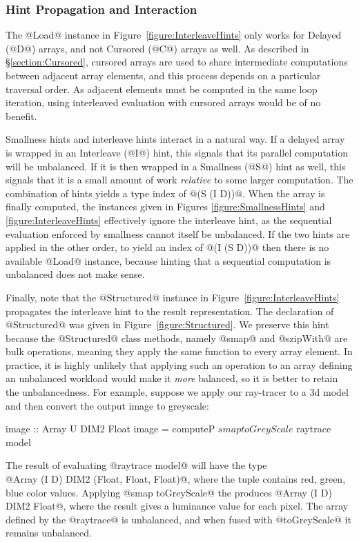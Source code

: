 \subsubsection{Hint Propagation and Interaction}
\label{section:HintInteraction}
The @Load@ instance in Figure~\ref{figure:InterleaveHints} only works for Delayed (@D@) arrays, and not Cursored (@C@) arrays as well. As described in \S\ref{section:Cursored}, cursored arrays are used to share intermediate computations between adjacent array elements, and this process depends on a particular traversal order. As adjacent elements must be computed in the same loop iteration, using interleaved evaluation with cursored arrays would be of no benefit.

Smallness hints and interleave hints interact in a natural way. If a delayed array is wrapped in an Interleave (@I@) hint, this signals that its parallel computation will be unbalanced. If it is then wrapped in a Smallness (@S@) hint as well, this signals that it is a small amount of work \emph{relative} to some larger computation. The combination of hints yields a type index of @(S (I D))@. When the array is finally computed, the instances given in Figures \ref{figure:SmallnessHints} and \ref{figure:InterleaveHints} effectively ignore the interleave hint, as the sequential evaluation enforced by smallness cannot itself be unbalanced. If the two hints are applied in the other order, to yield an index of @(I (S D))@ then there is no available @Load@ instance, because hinting that a sequential computation is unbalanced does not make sense.

Finally, note that the @Structured@ instance in Figure~\ref{figure:InterleaveHints} propagates the interleave hint to the result representation. The declaration of @Structured@ was given in Figure~\ref{figure:Structured}. We preserve this hint because the @Structured@ class methods, namely @smap@ and @szipWith@ are bulk operations, meaning they apply the same function to every array element. In practice, it is highly unlikely that applying such an operation to an array defining an unbalanced workload would make it \emph{more} balanced, so it is better to retain the unbalancedness. For example, suppose we apply our ray-tracer to a 3d model and then convert the output image to greyscale:
%
\begin{small}
\begin{code}
  image :: Array U DIM2 Float
  image = computeP $ smap toGreyScale $ raytrace model
\end{code}
\end{small}
%
The result of evaluating @raytrace model@ will have the type \\ @Array (I D) DIM2 (Float, Float, Float)@, where the tuple contains red, green, blue color values. Applying @smap toGreyScale@ the produces @Array (I D) DIM2 Float@, where the result gives a luminance value for each pixel. The array defined by the @raytrace@ is unbalanced, and when fused with @toGreyScale@ it remains unbalanced. 


